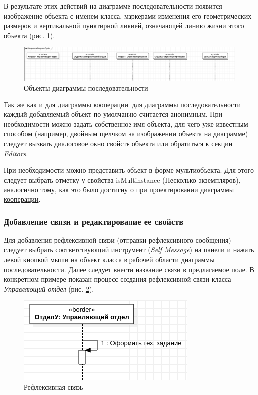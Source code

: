 \documentclass[a4paper,12pt]{extreport}
\begin{document}
В результате этих действий на диаграмме последовательности появится изображение объекта с именем класса, маркерами изменения его геометрических размеров и вертикальной пунктирной линией, означающей линию жизни этого объекта (рис. \ref{fig:sequenceobjects}).

\vspace{5ex}
\begin{figure}[h!]
	\centering
	\includegraphics[width=1\linewidth]{images/sequenceobjects}
	\caption{Объекты диаграммы последовательности}
	\label{fig:sequenceobjects}
\end{figure}

Так же как и для диаграммы кооперации, для диаграммы последовательности каждый добавляемый объект по умолчанию считается анонимным. При необходимости можно задать собственное имя объекта, для чего уже известным способом (например, двойным щелчком на изображении объекта на диаграмме) следует вызвать диалоговое окно свойств объекта или обратиться к секции \textit{Editors}.


При необходимости можно представить объект в форме мультиобъекта. Для этого следует выбрать отметку у свойства isMultinstance (Несколько экземпляров), аналогично тому, как это было достигнуто при проектировании \hyperref[multinstance]{диаграммы кооперации}.

\subsubsection*{Добавление связи и редактирование ее свойств}
Для добавления рефлексивной связи (отправки рефлексивного сообщения) следует выбрать соответствующий инструмент  (\textit{Self Message}) на панели и нажать левой кнопкой мыши на объект класса в рабочей области диаграммы последовательности. Далее следует внести название связи в предлагаемое поле. В конкретном примере показан процесс создания рефлексивной связи класса \textit{Управляющий отдел} (рис. \ref{fig:sequenceaction2}).

\begin{figure}[h!]
	\centering
	\includegraphics[width=0.6\linewidth]{images/sequenceaction2}
	\caption{Рефлексивная связь}
	\label{fig:sequenceaction2}
\end{figure}
\end{document}
